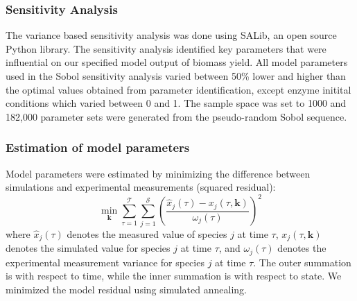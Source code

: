\documentclass[10pt,twocolumn,twoside,final]{IEEEtran}
\begin{document}
\subsubsection*{Sensitivity Analysis}
The variance based sensitivity analysis\cite{2010_saltelli} was done using SALib, an open source Python library. The sensitivity analysis identified key parameters that were influential on our specified model output of biomass yield. All model parameters used in the Sobol sensitivity analysis varied between 50\% lower and higher than the optimal values obtained from parameter identification, except enzyme initital conditions which varied between 0 and 1. The sample space was set to 1000 and 182,000 parameter sets were generated from the pseudo-random Sobol sequence.    

\subsubsection*{Estimation of model parameters}
Model parameters were estimated by minimizing the difference between simulations and experimental measurements (squared residual):
\begin{equation}\label{eqn:objective-function}
	\min_{\mathbf{k}} \sum_{\tau=1}^{\mathcal{T}}\sum_{j=1}^{\mathcal{S}}\left(\frac{\hat{x}_{j}\left(\tau\right) - x_{j}\left(\tau,\mathbf{k}\right)}{\omega_{j}\left(\tau\right)}\right)^{2}
\end{equation}where $\hat{x}_{j}\left(\tau\right)$ denotes the measured value of species $j$ at time $\tau$, $x_{j}\left(\tau,\mathbf{k}\right)$ denotes the simulated
value for species $j$ at time $\tau$, and $\omega_{j}\left(\tau\right)$ denotes the experimental measurement variance for species $j$ at time $\tau$.
The outer summation is with respect to time, while the inner summation is with respect to state. We minimized the model residual using simulated annealing. 


\end{document}
